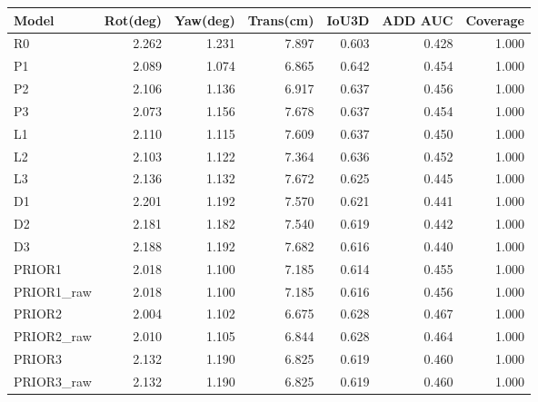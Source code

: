 \begin{longtable}{lrrrrrr}\toprule Model & Rot(deg) & Yaw(deg) & Trans(cm) & IoU3D & ADD AUC & Coverage\\\midrule\endhead
R0 & 2.262 & 1.231 & 7.897 & 0.603 & 0.428 & 1.000 \\
P1 & 2.089 & 1.074 & 6.865 & 0.642 & 0.454 & 1.000 \\
P2 & 2.106 & 1.136 & 6.917 & 0.637 & 0.456 & 1.000 \\
P3 & 2.073 & 1.156 & 7.678 & 0.637 & 0.454 & 1.000 \\
L1 & 2.110 & 1.115 & 7.609 & 0.637 & 0.450 & 1.000 \\
L2 & 2.103 & 1.122 & 7.364 & 0.636 & 0.452 & 1.000 \\
L3 & 2.136 & 1.132 & 7.672 & 0.625 & 0.445 & 1.000 \\
D1 & 2.201 & 1.192 & 7.570 & 0.621 & 0.441 & 1.000 \\
D2 & 2.181 & 1.182 & 7.540 & 0.619 & 0.442 & 1.000 \\
D3 & 2.188 & 1.192 & 7.682 & 0.616 & 0.440 & 1.000 \\
PRIOR1 & 2.018 & 1.100 & 7.185 & 0.614 & 0.455 & 1.000 \\
PRIOR1\_raw & 2.018 & 1.100 & 7.185 & 0.616 & 0.456 & 1.000 \\
PRIOR2 & 2.004 & 1.102 & 6.675 & 0.628 & 0.467 & 1.000 \\
PRIOR2\_raw & 2.010 & 1.105 & 6.844 & 0.628 & 0.464 & 1.000 \\
PRIOR3 & 2.132 & 1.190 & 6.825 & 0.619 & 0.460 & 1.000 \\
PRIOR3\_raw & 2.132 & 1.190 & 6.825 & 0.619 & 0.460 & 1.000 \\
\bottomrule\end{longtable}
